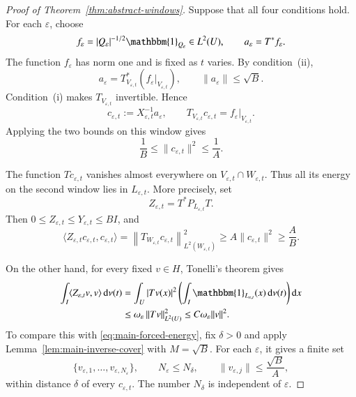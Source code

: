 \documentclass[10pt,a4paper]{amsart}
\def\d{\mathrm{d}}
\newcommand\norm[1]{\|#1\|}
\newcommand\inpro[2]{\langle #1,#2\rangle}
\newcommand\1{\mathbbm{1}}
\newcommand\Norm[2]{\left\|#1\right\|_{#2}}
\newcommand{\eps}{\varepsilon}
\def\d{\mathrm{d}}
\begin{document}
\begin{proof}[Proof of Theorem~\ref{thm:abstract-windows}]
Suppose that all four conditions hold. For each $\eps$, choose
\begin{equation*}
    f_\eps=|Q_\eps|^{-1/2}\1_{Q_\eps}\in L^2(U),
    \qquad a_\eps=T^*f_\eps.
\end{equation*}
The function $f_\eps$ has norm one and is fixed as $t$ varies.
By condition~(ii),
\begin{equation*}
    a_\eps=T_{V_{\eps,t}}^*(f_\eps|_{V_{\eps,t}}),
    \qquad\norm{a_\eps}\le\sqrt B.
\end{equation*}
Condition~(i) makes $T_{V_{\eps,t}}$ invertible. Hence
\begin{equation}\label{eq:main-exact-reconstruction}
    c_{\eps,t}:=X_{\eps,t}^{-1}a_\eps,
    \qquad T_{V_{\eps,t}}c_{\eps,t}=f_\eps|_{V_{\eps,t}}.
\end{equation}
Applying the two bounds on this window gives
\begin{equation}\label{eq:main-coefficient-size}
    \frac1B\le\norm{c_{\eps,t}}^2\le\frac1A.
\end{equation}

The function $Tc_{\eps,t}$ vanishes almost everywhere on
$V_{\eps,t}\cap W_{\eps,t}$. Thus all its energy on the second window lies in
$L_{\eps,t}$. More precisely, set
\begin{equation*}
    Z_{\eps,t}=T^*P_{L_{\eps,t}}T.
\end{equation*}
Then $0\le Z_{\eps,t}\le Y_{\eps,t}\le BI$, and
\begin{equation}\label{eq:main-forced-energy}
    \inpro{Z_{\eps,t}c_{\eps,t}}{c_{\eps,t}}
    =\Norm{T_{W_{\eps,t}}c_{\eps,t}}{L^2(W_{\eps,t})}^2
    \ge A\norm{c_{\eps,t}}^2\ge\frac AB.
\end{equation}

On the other hand, for every fixed $v\in H$, Tonelli's theorem gives
\begin{equation}\label{eq:main-fixed-energy}
    \begin{aligned}
    \int_I\inpro{Z_{\eps,t}v}{v}\,\d\nu(t)
    &=\int_U|Tv(x)|^2
      \left(\int_I\1_{L_{\eps,t}}(x)\,\d\nu(t)\right)\d x\\
    &\le\omega_\eps\Norm{Tv}{L^2(U)}^2
     \le C\omega_\eps\norm{v}^2.
    \end{aligned}
\end{equation}
To compare this with \eqref{eq:main-forced-energy}, fix $\delta>0$ and apply
Lemma~\ref{lem:main-inverse-cover} with $M=\sqrt B$. For each $\eps$, it gives
a finite set
\begin{equation*}
    \{v_{\eps,1},\ldots,v_{\eps,N_\eps}\},
    \qquad N_\eps\le N_\delta,
    \qquad\norm{v_{\eps,j}}\le\frac{\sqrt B}{A},
\end{equation*}
within distance $\delta$ of every $c_{\eps,t}$. The number $N_\delta$ is
independent of $\eps$.


\end{proof}
\end{document}
